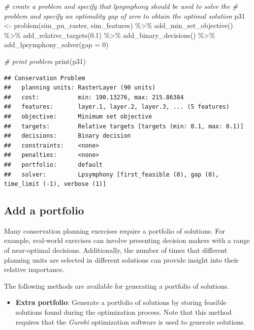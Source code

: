 \documentclass[
  12pt,
]{book}
\newenvironment{Shaded}{\begin{snugshade}}{\end{snugshade}}
\newcommand{\AttributeTok}[1]{\textcolor[rgb]{0.77,0.63,0.00}{#1}}
\newcommand{\CommentTok}[1]{\textcolor[rgb]{0.56,0.35,0.01}{\textit{#1}}}
\newcommand{\DecValTok}[1]{\textcolor[rgb]{0.00,0.00,0.81}{#1}}
\newcommand{\FloatTok}[1]{\textcolor[rgb]{0.00,0.00,0.81}{#1}}
\newcommand{\FunctionTok}[1]{\textcolor[rgb]{0.00,0.00,0.00}{#1}}
\newcommand{\NormalTok}[1]{#1}
\newcommand{\OtherTok}[1]{\textcolor[rgb]{0.56,0.35,0.01}{#1}}
\newcommand{\SpecialCharTok}[1]{\textcolor[rgb]{0.00,0.00,0.00}{#1}}
\providecommand{\tightlist}{%
  \setlength{\itemsep}{0pt}\setlength{\parskip}{0pt}}
\begin{document}
\begin{Shaded}
\begin{Highlighting}[]
\CommentTok{\# create a problem and specify that lpsymphony should be used to solve the}
\CommentTok{\# problem and specify an optimality gap of zero to obtain the optimal solution}
\NormalTok{p31 }\OtherTok{\textless{}{-}} \FunctionTok{problem}\NormalTok{(sim\_pu\_raster, sim\_features) }\SpecialCharTok{\%\textgreater{}\%}
       \FunctionTok{add\_min\_set\_objective}\NormalTok{() }\SpecialCharTok{\%\textgreater{}\%}
       \FunctionTok{add\_relative\_targets}\NormalTok{(}\FloatTok{0.1}\NormalTok{) }\SpecialCharTok{\%\textgreater{}\%}
       \FunctionTok{add\_binary\_decisions}\NormalTok{() }\SpecialCharTok{\%\textgreater{}\%}
       \FunctionTok{add\_lpsymphony\_solver}\NormalTok{(}\AttributeTok{gap =} \DecValTok{0}\NormalTok{)}

\CommentTok{\# print problem}
\FunctionTok{print}\NormalTok{(p31)}
\end{Highlighting}
\end{Shaded}

\begin{verbatim}
## Conservation Problem
##   planning units: RasterLayer (90 units)
##   cost:           min: 190.13276, max: 215.86384
##   features:       layer.1, layer.2, layer.3, ... (5 features)
##   objective:      Minimum set objective 
##   targets:        Relative targets [targets (min: 0.1, max: 0.1)]
##   decisions:      Binary decision 
##   constraints:    <none>
##   penalties:      <none>
##   portfolio:      default
##   solver:         Lpsymphony [first_feasible (0), gap (0), time_limit (-1), verbose (1)]
\end{verbatim}

\hypertarget{add-a-portfolio}{%
\subsection{Add a portfolio}\label{add-a-portfolio}}

Many conservation planning exercises require a portfolio of solutions. For example, real-world exercises can involve presenting decision makers with a range of near-optimal decisions. Additionally, the number of times that different planning units are selected in different solutions can provide insight into their relative importance.

The following methods are available for generating a portfolio of solutions.

\begin{itemize}
\tightlist
\item
  \textbf{Extra portfolio}: Generate a portfolio of solutions by storing feasible solutions found during the optimization process. Note that this method requires that the \emph{Gurobi} optimization software is used to generate solutions.
\end{itemize}
\end{document}

